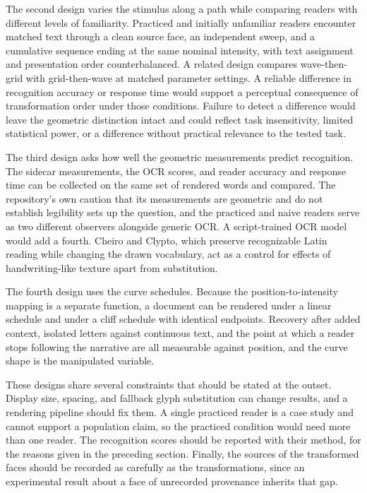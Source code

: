 \documentclass[11pt]{article}
\begin{document}
The second design varies the stimulus along a path while comparing readers with different levels of familiarity. Practiced and initially unfamiliar readers encounter matched text through a clean source face, an independent sweep, and a cumulative sequence ending at the same nominal intensity, with text assignment and presentation order counterbalanced. A related design compares wave-then-grid with grid-then-wave at matched parameter settings. A reliable difference in recognition accuracy or response time would support a perceptual consequence of transformation order under those conditions. Failure to detect a difference would leave the geometric distinction intact and could reflect task insensitivity, limited statistical power, or a difference without practical relevance to the tested task.

The third design asks how well the geometric measurements predict recognition. The sidecar measurements, the OCR scores, and reader accuracy and response time can be collected on the same set of rendered words and compared. The repository's own caution that its measurements are geometric and do not establish legibility sets up the question, and the practiced and naive readers serve as two different observers alongside generic OCR. A script-trained OCR model would add a fourth. Cheiro and Clypto, which preserve recognizable Latin reading while changing the drawn vocabulary, act as a control for effects of handwriting-like texture apart from substitution.

The fourth design uses the curve schedules. Because the position-to-intensity mapping is a separate function, a document can be rendered under a linear schedule and under a cliff schedule with identical endpoints. Recovery after added context, isolated letters against continuous text, and the point at which a reader stops following the narrative are all measurable against position, and the curve shape is the manipulated variable.

These designs share several constraints that should be stated at the outset. Display size, spacing, and fallback glyph substitution can change results, and a rendering pipeline should fix them. A single practiced reader is a case study and cannot support a population claim, so the practiced condition would need more than one reader. The recognition scores should be reported with their method, for the reasons given in the preceding section. Finally, the sources of the transformed faces should be recorded as carefully as the transformations, since an experimental result about a face of unrecorded provenance inherits that gap.
\end{document}
